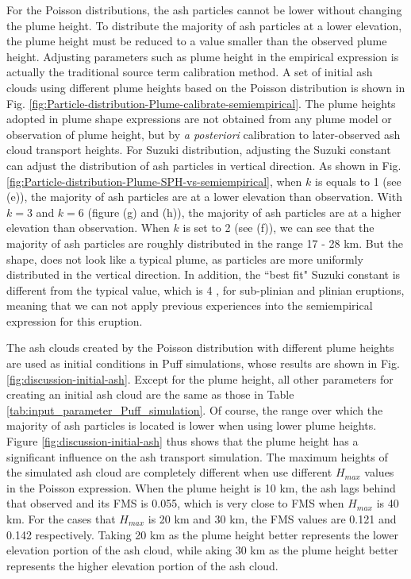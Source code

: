\documentclass[utf8]{frontiersSCNS} %
\begin{document}
For the Poisson distributions, the ash particles cannot be lower without changing the plume height. To distribute the majority of ash particles at a lower elevation, the plume height must be reduced to a value smaller than the observed plume height. Adjusting parameters such as plume height in the empirical expression is actually the traditional source term calibration method. A set of initial ash clouds using different plume heights based on the Poisson distribution is shown in Fig. \ref{fig:Particle-distribution-Plume-calibrate-semiempirical}. The plume heights adopted in plume shape expressions are not obtained from any plume model or observation of plume height, but by \textit{a posteriori} calibration to later-observed ash cloud transport heights. For Suzuki distribution, adjusting the Suzuki constant can adjust the distribution of ash particles in vertical direction. As shown in Fig. \ref{fig:Particle-distribution-Plume-SPH-vs-semiempirical}, when $k$ is equals to 1 (see (e)), the majority of ash particles are at a lower elevation than observation. With $k=3$ and $k = 6$ (figure (g) and (h)), the majority of ash particles are at a higher elevation than observation. When $k$ is set to 2 (see (f)), we can see that the majority of  ash particles are roughly distributed in the range 17 - 28 km. But the shape, does not look like a typical plume, as particles are more uniformly distributed in the vertical direction. In addition, the ``best fit" Suzuki constant is different from the typical value, which is 4 \citep{pfeiffer2005model}, for sub-plinian and plinian eruptions, meaning that we can not apply previous experiences into the semiempirical expression for this eruption.

The ash clouds created by the Poisson distribution with different plume heights are used as initial conditions in Puff simulations, whose results are shown in Fig. \ref{fig:discussion-initial-ash}. Except for the plume height, all other parameters for creating an initial ash cloud are the same as those in Table \ref{tab:input_parameter_Puff_simulation}. Of course, the range over which the majority of ash particles is located is lower when using lower plume heights. 
Figure \ref{fig:discussion-initial-ash} thus shows that the plume height has a significant influence on the ash transport simulation. The maximum heights of the simulated ash cloud are completely different when use different $H_{max}$ values in the Poisson expression. When the plume height is 10 km, the ash lags behind that observed and its FMS is 0.055, which is very close to FMS when $H_{max}$ is 40 km. For the cases that  $H_{max}$ is 20 km and 30 km, the FMS values are 0.121 and 0.142 respectively. Taking 20 km as the plume height better represents the lower elevation portion of the ash cloud, while aking 30 km as the plume height better represents the higher elevation portion of the ash cloud.
\end{document}
